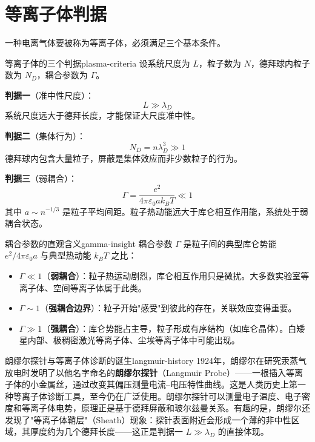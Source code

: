 \documentclass[12pt,a4paper,openany,oneside]{book}
\newcommand{\eps}{\varepsilon}
\newcommand{\difficulty}[1]{\marginnote{\textcolor{red}{\textbf{[#1]}}}}
\begin{document}
\section{等离子体判据}\difficulty{基础}

一种电离气体要被称为等离子体，必须满足三个基本条件。

\begin{theorem}{等离子体的三个判据}{plasma-criteria}
设系统尺度为 $L$，粒子数为 $N$，德拜球内粒子数为 $N_D$，耦合参数为 $\Gamma$。

\textbf{判据一}（准中性尺度）：
\[
L \gg \lambda_D
\]
系统尺度远大于德拜长度，才能保证大尺度准中性。

\textbf{判据二}（集体行为）：
\[
N_D = n\lambda_D^3 \gg 1
\]
德拜球内包含大量粒子，屏蔽是集体效应而非少数粒子的行为。

\textbf{判据三}（弱耦合）：
\[
\Gamma = \frac{e^2}{4\pi\eps_0 a k_B T} \ll 1
\]
其中 $a \sim n^{-1/3}$ 是粒子平均间距。粒子热动能远大于库仑相互作用能，系统处于弱耦合状态。
\end{theorem}

\begin{insight}{耦合参数的直观含义}{gamma-insight}
耦合参数 $\Gamma$ 是粒子间的典型库仑势能 $e^2/4\pi\eps_0 a$ 与典型热动能 $k_BT$ 之比：
\begin{itemize}
\item $\Gamma \ll 1$（\textbf{弱耦合}）：粒子热运动剧烈，库仑相互作用只是微扰。大多数实验室等离子体、空间等离子体属于此类。
\item $\Gamma \sim 1$（\textbf{强耦合边界}）：粒子开始"感受"到彼此的存在，关联效应变得重要。
\item $\Gamma \gg 1$（\textbf{强耦合}）：库仑势能占主导，粒子形成有序结构（如库仑晶体）。白矮星内部、极稠密激光等离子体、尘埃等离子体中可能出现。
\end{itemize}
\end{insight}

\begin{history}{朗缪尔探针与等离子体诊断的诞生}{langmuir-history}
1924年，朗缪尔在研究汞蒸气放电时发明了以他名字命名的\textbf{朗缪尔探针}（Langmuir Probe）——一根插入等离子体的小金属丝，通过改变其偏压测量电流--电压特性曲线。这是人类历史上第一种等离子体诊断工具，至今仍在广泛使用。朗缪尔探针可以测量电子温度、电子密度和等离子体电势，原理正是基于德拜屏蔽和玻尔兹曼关系。有趣的是，朗缪尔还发现了"等离子体鞘层"（Sheath）现象：探针表面附近会形成一个薄的非中性区域，其厚度约为几个德拜长度——这正是判据一 $L \gg \lambda_D$ 的直接体现。
\end{history}
\end{document}
